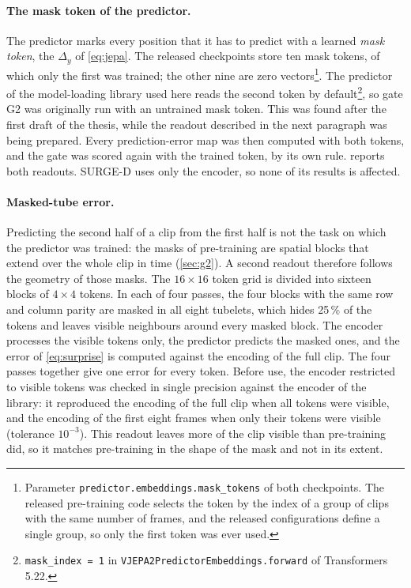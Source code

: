 \paragraph{The mask token of the predictor.} The predictor marks every
position that it has to predict with a learned \emph{mask token}, the
$\Delta_y$ of \cref{eq:jepa}. The released checkpoints store ten mask tokens,
of which only the first was trained; the other nine are zero
vectors\footnote{Parameter \texttt{predictor.embeddings.mask\_tokens} of both
checkpoints. The released pre-training code selects the token by the index of
a group of clips with the same number of frames, and the released
configurations define a single group, so only the first token was ever
used.}. The predictor of the model-loading library used here reads the second
token by default\footnote{\texttt{mask\_index = 1} in
\texttt{VJEPA2PredictorEmbeddings.forward} of Transformers 5.22.}, so gate G2
was originally run with an untrained mask token. This was found after the
first draft of the thesis, while the readout described in the next paragraph
was being prepared. Every prediction-error map was then computed with both
tokens, and the gate was scored again with the trained token, by its own
rule.  reports both readouts. SURGE-D uses only the encoder, so
none of its results is affected.

\paragraph{Masked-tube error.} Predicting the second half of a clip from the
first half is not the task on which the predictor was trained: the masks of
pre-training are spatial blocks that extend over the whole clip in time
(\cref{sec:g2}). A second readout therefore follows the geometry of those
masks. The $16\times16$ token grid is divided into sixteen blocks of
$4\times4$ tokens. In each of four passes, the four blocks with the same row
and column parity are masked in all eight tubelets, which hides 25\,\% of the
tokens and leaves visible neighbours around every masked block. The encoder
processes the visible tokens only, the predictor predicts the masked ones,
and the error of \cref{eq:surprise} is computed against the encoding of the
full clip. The four passes together give one error for every token. Before
use, the encoder restricted to visible tokens was checked in single precision
against the encoder of the library: it reproduced the encoding of the full
clip when all tokens were visible, and the encoding of the first eight frames
when only their tokens were visible (tolerance $10^{-3}$). This readout
leaves more of the clip visible than pre-training did, so it matches
pre-training in the shape of the mask and not in its extent.

